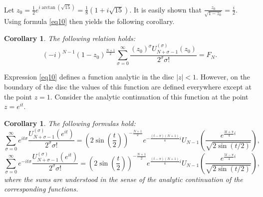 \documentclass{article}
\newtheorem{cor}[thm]{Corollary}
\begin{document}
Let $z_0 = \frac{1}{2}e^{i\arctan(\sqrt{15})} = \frac{1}{8}(1 + i\sqrt{15})$. It is easily shown that $\frac{z_0}{\sqrt{1 - z_0}} = \frac{i}{2}$. Using formula \eqref{eq10} then yields the following corollary.

\begin{cor}\label{cor3}
The following relation holds:
$$
(-i)^{N-1}(1 - z_0)^{\frac{N+1}{2}}\sum_{\sigma=0}^\infty\frac{(z_0)^\sigma U_{N+\sigma-1}^{(\sigma)}(z_0)}{2^\sigma \sigma!} = F_N.
$$
\end{cor}

Expression \eqref{eq10} defines a function analytic in the disc $|z| < 1$. However, on the boundary of the disc the values of this function are defined everywhere except at the point $z = 1$. Consider the analytic continuation of this function at the point $z = e^{it}$.

\begin{cor}\label{cor4}
The following formulas hold:
\begin{equation}\label{eq12}
\sum_{\sigma = 0}^{\infty} e^{it\sigma}\frac{U_{N + \sigma - 1}^{(\sigma)}(e^{it})}{2^\sigma \sigma!} = \left(2\sin\left(\frac{t}{2}\right)\right)^{-\frac{N+1}{2}}e^{-\frac{(t - \pi)(N + 1)}{4}i}U_{N-1}\left(\frac{e^{\frac{3t + \pi}{4}i}}{\sqrt{2\sin(t/2)}}\right),
\end{equation}
\begin{equation}\label{eq13}
\sum_{\sigma = 0}^{\infty} e^{-it\sigma}\frac{U_{N + \sigma - 1}^{(\sigma)}(e^{it})}{2^\sigma \sigma!} = \left(2\sin\left(\frac{t}{2}\right)\right)^{-\frac{N+1}{2}}e^{\frac{(t - \pi)(N + 1)}{4}i}U_{N-1}\left(\frac{e^{\frac{5t - \pi}{4}i}}{\sqrt{2\sin(t/2)}}\right),
\end{equation}
where the sums are understood in the sense of the analytic continuation of the corresponding functions.
\end{cor}
\end{document}
